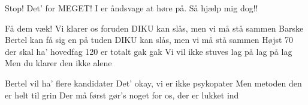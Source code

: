 \documentclass[a4paper,11pt]{article}
\begin{document}
\begin{sketch}

 Stop!  Det' for MEGET!  I er åndsvage at høre på.  Så hjælp mig dog!!


\end{sketch}

\begin{song}

 Få dem væk!  Vi klarer os foruden
    DIKU kan slås, men vi må stå sammen
  Barske Bertel kan få sig en på tuden
    DIKU kan slås, men vi må stå sammen
  Højst 70 der skal ha' hovedfag
    120 er totalt gak gak
  Vi vil ikke stuves lag på lag på lag
    Men du klarer den ikke alene

 Bertel vil ha' flere kandidater
  Det' okay, vi er ikke psykopater
  Men metoden den er helt til grin
  Der må først gør's noget for os, der er lukket ind
  

\end{song}
\end{document}
